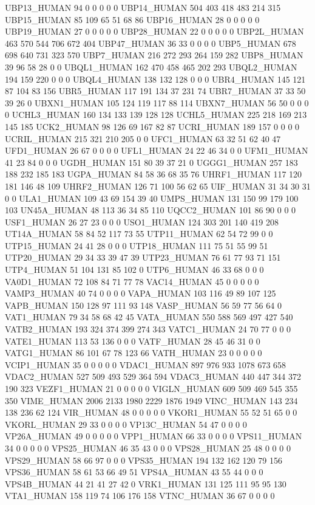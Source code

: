UBP13_HUMAN	94	0	0	0	0	0
UBP14_HUMAN	504	403	418	483	214	315
UBP15_HUMAN	85	109	65	51	68	86
UBP16_HUMAN	28	0	0	0	0	0
UBP19_HUMAN	27	0	0	0	0	0
UBP28_HUMAN	22	0	0	0	0	0
UBP2L_HUMAN	463	570	544	706	672	404
UBP47_HUMAN	36	33	0	0	0	0
UBP5_HUMAN	678	698	640	731	323	570
UBP7_HUMAN	216	272	293	264	159	282
UBP8_HUMAN	39	96	58	28	0	0
UBQL1_HUMAN	162	470	458	465	202	293
UBQL2_HUMAN	194	159	220	0	0	0
UBQL4_HUMAN	138	132	128	0	0	0
UBR4_HUMAN	145	121	87	104	83	156
UBR5_HUMAN	117	191	134	37	231	74
UBR7_HUMAN	37	33	50	39	26	0
UBXN1_HUMAN	105	124	119	117	88	114
UBXN7_HUMAN	56	50	0	0	0	0
UCHL3_HUMAN	160	134	133	139	128	128
UCHL5_HUMAN	225	218	169	213	145	185
UCK2_HUMAN	98	126	69	167	82	87
UCRI_HUMAN	189	157	0	0	0	0
UCRIL_HUMAN	215	321	210	205	0	0
UFC1_HUMAN	63	32	51	62	40	47
UFD1_HUMAN	26	67	0	0	0	0
UFL1_HUMAN	24	22	46	34	0	0
UFM1_HUMAN	41	23	84	0	0	0
UGDH_HUMAN	151	80	39	37	21	0
UGGG1_HUMAN	257	183	188	232	185	183
UGPA_HUMAN	84	58	36	68	35	76
UHRF1_HUMAN	117	120	181	146	48	109
UHRF2_HUMAN	126	71	100	56	62	65
UIF_HUMAN	31	34	30	31	0	0
ULA1_HUMAN	109	43	69	154	39	40
UMPS_HUMAN	131	150	99	179	100	103
UN45A_HUMAN	48	113	36	34	85	110
UQCC2_HUMAN	101	86	90	0	0	0
USF1_HUMAN	26	27	23	0	0	0
USO1_HUMAN	124	303	201	140	419	208
UT14A_HUMAN	58	84	52	117	73	55
UTP11_HUMAN	62	54	72	99	0	0
UTP15_HUMAN	24	41	28	0	0	0
UTP18_HUMAN	111	75	51	55	99	51
UTP20_HUMAN	29	34	33	39	47	39
UTP23_HUMAN	76	61	77	93	71	151
UTP4_HUMAN	51	104	131	85	102	0
UTP6_HUMAN	46	33	68	0	0	0
VA0D1_HUMAN	72	108	84	71	77	78
VAC14_HUMAN	45	0	0	0	0	0
VAMP3_HUMAN	40	74	0	0	0	0
VAPA_HUMAN	103	116	49	89	107	125
VAPB_HUMAN	150	128	97	111	93	148
VASP_HUMAN	56	59	77	56	64	0
VAT1_HUMAN	79	34	58	68	42	45
VATA_HUMAN	550	588	569	497	427	540
VATB2_HUMAN	193	324	374	399	274	343
VATC1_HUMAN	24	70	77	0	0	0
VATE1_HUMAN	113	53	136	0	0	0
VATF_HUMAN	28	45	46	31	0	0
VATG1_HUMAN	86	101	67	78	123	66
VATH_HUMAN	23	0	0	0	0	0
VCIP1_HUMAN	35	0	0	0	0	0
VDAC1_HUMAN	897	976	933	1078	673	658
VDAC2_HUMAN	527	509	493	529	364	594
VDAC3_HUMAN	440	447	344	372	190	323
VEZF1_HUMAN	21	0	0	0	0	0
VIGLN_HUMAN	609	509	469	545	355	350
VIME_HUMAN	2006	2133	1980	2229	1876	1949
VINC_HUMAN	143	234	138	236	62	124
VIR_HUMAN	48	0	0	0	0	0
VKOR1_HUMAN	55	52	51	65	0	0
VKORL_HUMAN	29	33	0	0	0	0
VP13C_HUMAN	54	47	0	0	0	0
VP26A_HUMAN	49	0	0	0	0	0
VPP1_HUMAN	66	33	0	0	0	0
VPS11_HUMAN	34	0	0	0	0	0
VPS25_HUMAN	46	35	43	0	0	0
VPS28_HUMAN	25	48	0	0	0	0
VPS29_HUMAN	58	66	97	0	0	0
VPS35_HUMAN	194	132	162	120	79	156
VPS36_HUMAN	58	61	53	66	49	51
VPS4A_HUMAN	43	55	44	0	0	0
VPS4B_HUMAN	44	21	41	27	42	0
VRK1_HUMAN	131	125	111	95	95	130
VTA1_HUMAN	158	119	74	106	176	158
VTNC_HUMAN	36	67	0	0	0	0
